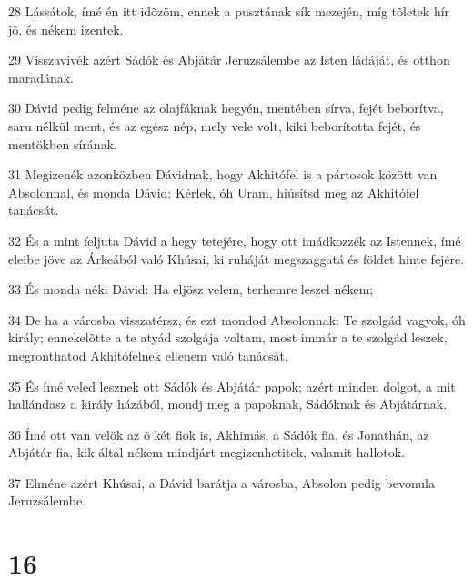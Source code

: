 \par 28 Lássátok, ímé én itt idõzöm, ennek a pusztának sík mezején, míg tõletek hír jõ, és nékem izentek.
\par 29 Visszavivék azért Sádók és Abjátár Jeruzsálembe az Isten ládáját, és otthon maradának.
\par 30 Dávid pedig felméne az olajfáknak hegyén, mentében sírva, fejét beborítva, saru nélkül ment, és az egész nép, mely vele volt, kiki beborította fejét, és mentökben sírának.
\par 31 Megizenék azonközben Dávidnak, hogy Akhitófel is a pártosok között van Absolonnal, és monda Dávid: Kérlek, óh Uram, hiúsítsd meg az Akhitófel tanácsát.
\par 32 És a mint feljuta Dávid a hegy tetejére, hogy ott imádkozzék az Istennek, ímé eleibe jöve az Árkeából való Khúsai, ki ruháját megszaggatá és földet  hinte fejére.
\par 33 És monda néki Dávid: Ha eljösz velem, terhemre leszel nékem;
\par 34 De ha a városba visszatérsz, és ezt mondod Absolonnak: Te szolgád vagyok, óh király; ennekelõtte a te atyád szolgája voltam, most immár a te szolgád leszek, megronthatod Akhitófelnek ellenem való tanácsát.
\par 35 És ímé veled lesznek ott Sádók és Abjátár papok; azért minden dolgot, a mit hallándasz a király házából, mondj meg a papoknak, Sádóknak és Abjátárnak.
\par 36 Ímé ott van velök az õ két fiok is, Akhimás, a Sádók fia, és Jonathán, az Abjátár fia, kik által nékem mindjárt megizenhetitek, valamit hallotok.
\par 37 Elméne azért Khúsai, a Dávid barátja a városba, Absolon pedig bevonula Jeruzsálembe.

\chapter{16}

